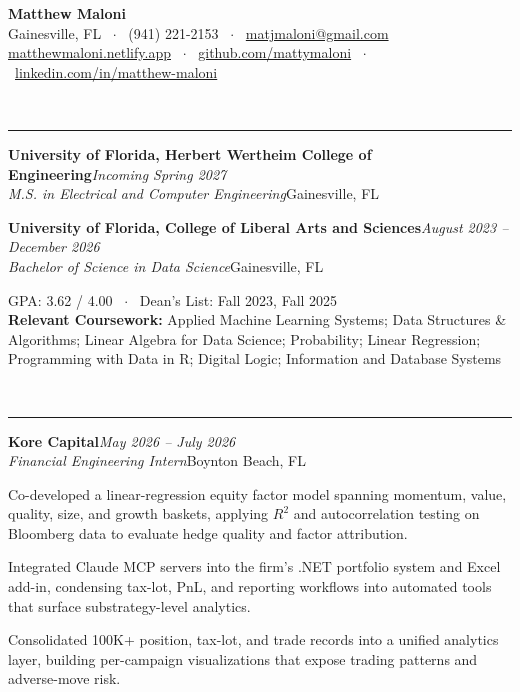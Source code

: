 \documentclass[10pt,letterpaper]{article}
\newcommand{\rsection}[1]{%
  \vspace{0.3em}%
  \noindent{\bfseries\scshape #1}\\[-0.42em]
  \noindent\rule{\textwidth}{0.6pt}\par\vspace{0.12em}%
}
\newenvironment{tight}{%
  \begin{list}{\textbullet}{%
    \setlength{\leftmargin}{1.1em}%
    \setlength{\labelwidth}{0.8em}%
    \setlength{\labelsep}{0.4em}%
    \setlength{\itemsep}{0.03em}%
    \setlength{\parsep}{0pt}%
    \setlength{\topsep}{0.09em}%
    \setlength{\partopsep}{0pt}%
    \setlength{\listparindent}{0pt}%
  }%
}{\end{list}}
\newcommand{\entry}[4]{%
  \vspace{0.12em}%
  \noindent\textbf{#1}\hfill\textit{#2}\\[0.02em]
  \noindent\textit{#3}\hfill{\small #4}\par\vspace{0.02em}%
}
\begin{document}
\begin{center}
  {\LARGE\bfseries Matthew Maloni}\\[0.35em]
  {\small
    Gainesville, FL \ $\cdot$ \ (941) 221-2153 \ $\cdot$ \ \href{mailto:matjmaloni@gmail.com}{\mbox{matjmaloni@gmail.com}}\\[0.2em]
    \href{https://matthewmaloni.netlify.app}{matthewmaloni.netlify.app} \ $\cdot$ \
    \href{https://github.com/mattymaloni}{github.com/mattymaloni} \ $\cdot$ \
    \href{https://www.linkedin.com/in/matthew-maloni/}{linkedin.com/in/matthew-maloni}
  }
\end{center}

\rsection{Education}

\entry{University of Florida, Herbert Wertheim College of Engineering}{Incoming Spring 2027}{M.S. in Electrical and Computer Engineering}{Gainesville, FL}

\entry{University of Florida, College of Liberal Arts and Sciences}{August 2023 -- December 2026}{Bachelor of Science in Data Science}{Gainesville, FL}
GPA: 3.62 / 4.00 \ $\cdot$ \ Dean's List: Fall 2023, Fall 2025\\
\textbf{Relevant Coursework:} Applied Machine Learning Systems; Data Structures \& Algorithms; Linear Algebra for Data Science; Probability; Linear Regression; Programming with Data in R; Digital Logic; Information and Database Systems

\rsection{Work Experience}

\entry{Kore Capital}{May 2026 -- July 2026}{Financial Engineering Intern}{Boynton Beach, FL}
\begin{tight}
  \item Co-developed a linear-regression equity factor model spanning momentum, value, quality, size, and growth baskets, applying $R^2$ and autocorrelation testing on Bloomberg data to evaluate hedge quality and factor attribution.
  \item Integrated Claude MCP servers into the firm's .NET portfolio system and Excel add-in, condensing tax-lot, PnL, and reporting workflows into automated tools that surface substrategy-level analytics.
  \item Consolidated 100K+ position, tax-lot, and trade records into a unified analytics layer, building per-campaign visualizations that expose trading patterns and adverse-move risk.
\end{tight}
\end{document}
